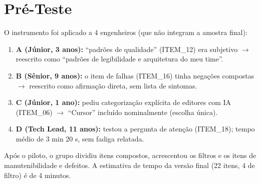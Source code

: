 \section{Pré-Teste}

O instrumento foi aplicado a 4 engenheiros (que não integram a amostra final):

\begin{enumerate}
  \item \textbf{A (Júnior, 3 anos):} \enquote{padrões de qualidade} (ITEM\_12) era subjetivo $\to$ reescrito como \enquote{padrões de legibilidade e arquitetura do meu time}.
  \item \textbf{B (Sênior, 9 anos):} o item de falhas (ITEM\_16) tinha negações compostas $\to$ reescrito como afirmação direta, sem lista de sintomas.
  \item \textbf{C (Júnior, 1 ano):} pediu categorização explícita de editores com IA (ITEM\_06) $\to$ \enquote{Cursor} incluído nominalmente (escolha única).
  \item \textbf{D (Tech Lead, 11 anos):} testou a pergunta de atenção (ITEM\_18); tempo médio de 3 min 20 s, sem fadiga relatada.
\end{enumerate}

Após o piloto, o grupo dividiu itens compostos, acrescentou os filtros e os itens de manutenibilidade e defeitos. A estimativa de tempo da versão final (22 itens, 4 de filtro) é de 4 minutos.
